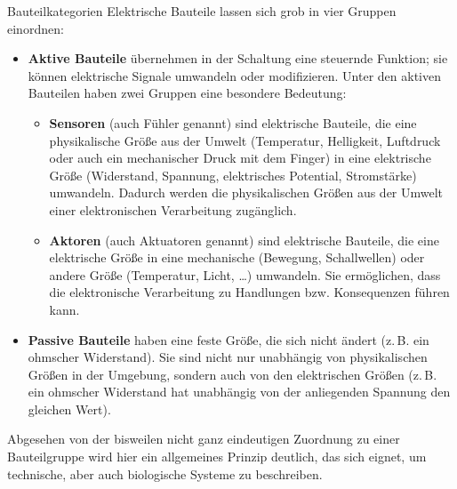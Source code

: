 \begin{zsfg}{Bauteilkategorien}
	Elektrische Bauteile lassen sich grob in vier Gruppen einordnen:
	
	\begin{itemize}[itemsep=0ex]
		\item \textbf{Aktive Bauteile} übernehmen in der Schaltung eine steuernde Funktion; sie können elektrische Signale umwandeln oder modifizieren. Unter den aktiven Bauteilen haben zwei Gruppen eine besondere Bedeutung:
		\begin{itemize}[itemsep=0mm,parsep=0mm]
			\item \textbf{Sensoren} (auch Fühler genannt) sind elektrische Bauteile, die eine physikalische Größe aus der Umwelt (Temperatur, Helligkeit, Luftdruck oder auch ein mechanischer Druck mit dem Finger) in eine elektrische Größe (Widerstand, Spannung, elektrisches Potential, Stromstärke) umwandeln. Dadurch werden die physikalischen Größen aus der Umwelt einer elektronischen Verarbeitung zugänglich.
			\item \textbf{Aktoren} (auch Aktuatoren genannt) sind elektrische Bauteile, die eine elektrische Größe in eine mechanische (Bewegung, Schallwellen) oder andere Größe (Temperatur, Licht, \dots) umwandeln. Sie ermöglichen, dass die elektronische Verarbeitung zu Handlungen bzw. Konsequenzen führen kann.
		\end{itemize}
		\item \textbf{Passive Bauteile} haben eine feste Größe, die sich nicht ändert (z.\,B. ein ohmscher Widerstand). Sie sind nicht nur unabhängig von physikalischen Größen in der Umgebung, sondern auch von den elektrischen Größen (z.\,B. ein ohmscher Widerstand hat unabhängig von der anliegenden Spannung den gleichen Wert). 
	\end{itemize}
\end{zsfg}

Abgesehen von der bisweilen nicht ganz eindeutigen Zuordnung zu einer Bauteilgruppe wird hier ein allgemeines Prinzip deutlich, das sich eignet, um technische, aber auch biologische Systeme zu beschreiben.

